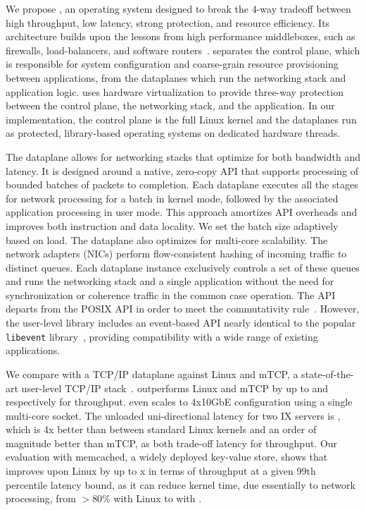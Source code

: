 We propose \ix, an operating system designed to break the $4$-way
tradeoff between high throughput, low latency, strong protection, and
resource efficiency. Its architecture builds upon the lessons from
high performance middleboxes, such as firewalls, load-balancers, and
software routers~\cite{routebricks,click}. \ix separates the control
plane, which is responsible for system configuration and coarse-grain
resource provisioning between applications, from the dataplanes which
run the networking stack and application logic. \ix uses hardware
virtualization %
to provide three-way protection between the control plane, the
networking stack, and the application. In our implementation, the
control plane is the full Linux kernel and the dataplanes run as
protected, library-based operating systems on dedicated hardware
threads.

The \ix dataplane allows for networking stacks that optimize for both
bandwidth and latency. It is designed around a native, zero-copy API
that supports processing of bounded batches of packets to
completion. Each dataplane executes all the stages for network
processing for a batch in kernel mode, followed by the associated
application processing in user mode. This approach amortizes API
overheads and improves both instruction and data locality. We set the
batch size adaptively based on load. The \ix dataplane also optimizes
for multi-core scalability.  The network adapters (NICs) perform
flow-consistent hashing of incoming traffic to distinct queues. Each
dataplane instance exclusively controls a set of these queues and runs
the networking stack and a single application without the need for
synchronization or coherence traffic in the common case operation. The
\ix API departs from the POSIX API in order to meet the commutativity
rule~\cite{DBLP:conf/sosp/ClementsKZMK13}.  However, the \ix
user-level library includes an event-based API nearly identical to the
popular \texttt{libevent} library~\cite{provos2003libevent}, providing
compatibility with a wide range of existing applications.

We compare \ix with a TCP/IP dataplane against Linux
 and mTCP, a state-of-the-art user-level TCP/IP
stack~\cite{jeong2014mtcp}.  \ix outperforms Linux and mTCP by up to
 and  respectively for throughput. \ix
even scales to 4x10GbE configuration using a single multi-core socket.
The unloaded uni-directional latency for two IX servers is
\microsecond, which is 4x better than between standard
Linux kernels and an order of magnitude better than mTCP, as both
trade-off latency for throughput.  Our evaluation with memcached, a
widely deployed key-value store, shows that \ix improves upon Linux by
up to x in terms of throughput at a given 99th
percentile latency bound, as it can reduce kernel time, due
essentially to network processing, from $>80\%$ with Linux to
 with \ix.


